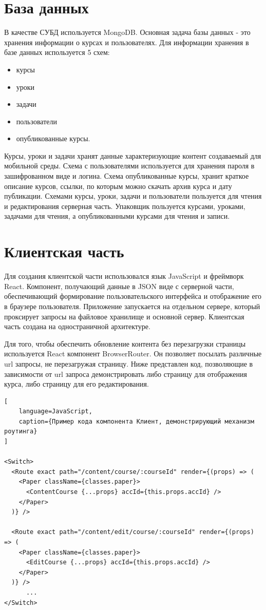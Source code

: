 \documentclass[%
  a5paper,
  subf,
  href,
  master,
  dotsinheaders 
]{csse-fcs}
\begin{document}
\section{База данных}

В качестве СУБД используется MongoDB. Основная задача базы данных - это хранения информации о курсах и пользователях. Для информации хранения в базе данных используется 5 схем:

\begin{itemize}
	\item курсы
	\item уроки
	\item задачи
	\item пользователи
	\item опубликованные курсы.
\end{itemize}

Курсы, уроки и задачи хранят данные характеризующие контент создаваемый для мобильной среды. Схема с пользователями используется для хранения пароля в зашифрованном виде и логина. Схема опубликованные курсы, хранит краткое описание курсов, ссылки, по которым можно скачать архив курса и дату публикации. Схемами курсы, уроки, задачи и пользователи пользуется для чтения и редактирования серверная часть. Упаковщик пользуется курсами, уроками, задачами для чтения, а опубликованными курсами для чтения и записи.

\section{Клиентская часть}

Для создания клиентской части использовался язык JavaScript и фреймворк React. Компонент, получающий данные в JSON виде с серверной части, обеспечивающий формирование пользовательского интерфейса и отображение его в браузере пользователя. Приложение запускается на отдельном сервере, который проксирует запросы на файловое хранилище и основной сервер. Клиентская часть создана на одностраничной архитектуре. 

Для того, чтобы обеспечить обновление контента без перезагрузки страницы используется React компонент BrowserRouter. Он позволяет посылать различные url запросы, не перезагружая страницу. Ниже представлен код, позволяющие в зависимости от url запроса демонстрировать либо страницу для отображения курса, либо страницу для его редактирования.


\begin{lstlisting}[
    language=JavaScript,
    caption={Пример кода компонента Клиент, демонстрирующий механизм роутинга}
]

<Switch>
  <Route exact path="/content/course/:courseId" render={(props) => (
    <Paper className={classes.paper}>
      <ContentCourse {...props} accId={this.props.accId} />
    </Paper>
  )} />
	
  <Route exact path="/content/edit/course/:courseId" render={(props) => (
    <Paper className={classes.paper}>
      <EditCourse {...props} accId={this.props.accId} />
    </Paper>
  )} />
      ...
</Switch>

\end{lstlisting}
\end{document}
